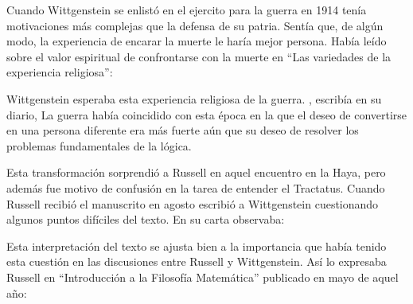 Cuando Wittgenstein se enlistó en el ejercito para la guerra en 1914 tenía
motivaciones más complejas que la defensa de su patria.\autocite[loc2276]{monk}
Sentía que, de algún modo, la experiencia de encarar la muerte le haría mejor
persona. Había leído sobre el valor espiritual de confrontarse con la muerte en
``Las variedades de la experiencia religiosa'':

Wittgenstein esperaba esta experiencia religiosa de la guerra.
, escribía en su diario, \autocite[loc2295]{monk}
La guerra había coincidido con esta época en la que el deseo de convertirse en
una persona diferente era más fuerte aún que su deseo de resolver los problemas
fundamentales de la lógica.\autocite[loc2305]{monk}

Esta transformación sorprendió a Russell en aquel encuentro en la Haya, pero
además fue motivo de confusión en la tarea de entender el Tractatus. Cuando
Russell recibió el manuscrito en agosto escribió a Wittgenstein cuestionando
algunos puntos difíciles del texto. En su carta observaba: 

Esta interpretación del texto se ajusta bien a la importancia que había tenido
esta cuestión en las discusiones entre Russell y Wittgenstein. Así lo expresaba
Russell en ``Introducción a la Filosofía Matemática'' publicado en mayo de aquel
año: 

